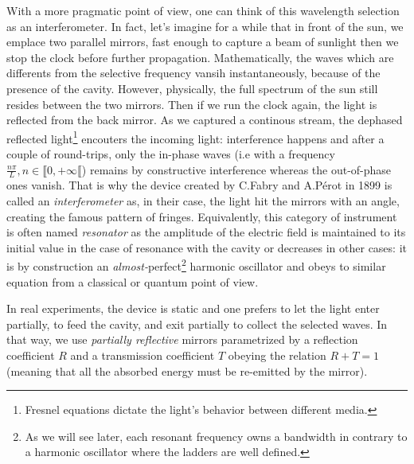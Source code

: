 \documentclass[10pt]{report}
\begin{document}
With a more pragmatic point of view, one can think of this wavelength selection as an interferometer. In fact, let's imagine for a while that in front of the sun, we emplace two parallel mirrors, fast enough to capture a beam of sunlight then we stop the clock before further propagation. Mathematically, the waves which are differents from the selective frequency vansih instantaneously, because of the presence of the cavity. However, physically, the full spectrum of the sun still resides between the two mirrors. Then if we run the clock again, the light is reflected from the back mirror. As we captured a continous stream, the dephased reflected light\footnote{Fresnel equations dictate the light's behavior between different media.} encouters the incoming light: interference happens and after a couple of round-trips, only the in-phase waves (i.e with a frequency $\frac{n\pi}{L}, n\in \llbracket 0, +\infty \llbracket $) remains by constructive interference whereas the out-of-phase ones vanish. That is why the device created by C.Fabry and A.Pérot in 1899 is called an \textit{interferometer} as, in their case, the light hit the mirrors with an angle, creating the famous pattern of fringes. Equivalently, this category of instrument is often named \textit{resonator} as the amplitude of the electric field is maintained to its initial value in the case of resonance with the cavity or decreases in other cases: it is by construction an \textit{almost-}perfect\footnote{As we will see later, each resonant frequency owns a bandwidth in contrary to a harmonic oscillator where the ladders are well defined.} harmonic oscillator and obeys to similar equation from a classical or quantum point of view.

In real experiments, the device is static and one prefers to let the light enter partially, to feed the cavity, and exit partially to collect the selected waves. In that way, we use \textit{partially reflective} mirrors parametrized by a reflection coefficient $R$ and a transmission coefficient $T$ obeying the relation $R + T = 1$ (meaning that all the absorbed energy must be re-emitted by the mirror).
\end{document}
